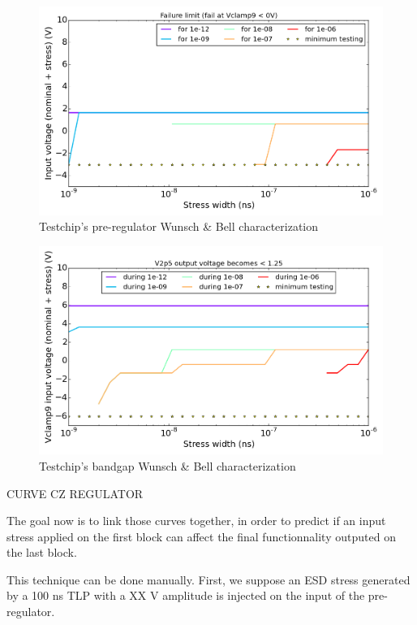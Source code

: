 \begin{figure}[!htbp]
  \centering
  \includegraphics[width=\textwidth]{src/4/figures/cz_vpre.png}
  \caption{Testchip's pre-regulator Wunsch & Bell characterization}
  \label{pre_regu_wb}
\end{figure}

\begin{figure}[!htbp]
  \centering
  \includegraphics[width=\textwidth]{src/4/figures/cz_bandgap.png}
  \caption{Testchip's bandgap Wunsch & Bell characterization}
  \label{bandgap_wb}
\end{figure}


CURVE CZ REGULATOR

The goal now is to link those curves together, in order to predict if an input
stress applied on the first block can affect the final functionnality outputed
on the last block.

This technique can be done manually.
First, we suppose an ESD stress generated by a 100 ns TLP with a XX V amplitude is injected on the input
of the pre-regulator.

